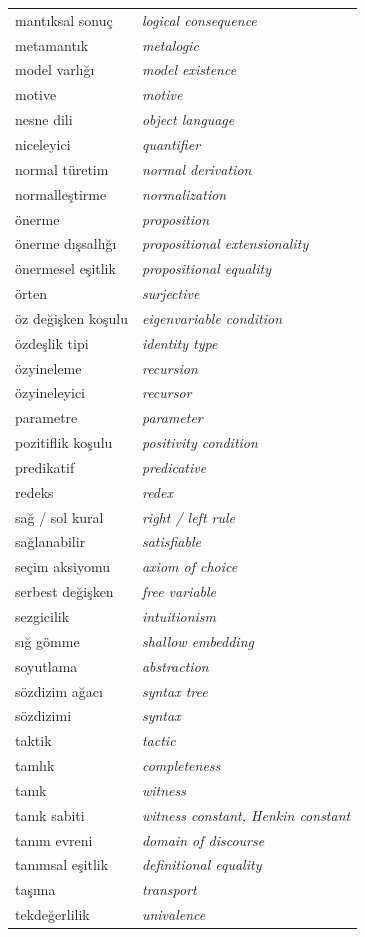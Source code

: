 \begin{center}
\begin{tabularx}{\linewidth}{>{\raggedright\arraybackslash}X >{\raggedright\arraybackslash\itshape}X}
mantıksal sonuç & logical consequence \\
metamantık & metalogic \\
model varlığı & model existence \\
motive & motive \\
nesne dili & object language \\
niceleyici & quantifier \\
normal türetim & normal derivation \\
normalleştirme & normalization \\
önerme & proposition \\
önerme dışsallığı & propositional extensionality \\
önermesel eşitlik & propositional equality \\
örten & surjective \\
öz değişken koşulu & eigenvariable condition \\
özdeşlik tipi & identity type \\
özyineleme & recursion \\
özyineleyici & recursor \\
parametre & parameter \\
pozitiflik koşulu & positivity condition \\
predikatif & predicative \\
redeks & redex \\
sağ / sol kural & right / left rule \\
sağlanabilir & satisfiable \\
seçim aksiyomu & axiom of choice \\
serbest değişken & free variable \\
sezgicilik & intuitionism \\
sığ gömme & shallow embedding \\
soyutlama & abstraction \\
sözdizim ağacı & syntax tree \\
sözdizimi & syntax \\
taktik & tactic \\
tamlık & completeness \\
tanık & witness \\
tanık sabiti & witness constant, Henkin constant \\
tanım evreni & domain of discourse \\
tanımsal eşitlik & definitional equality \\
taşıma & transport \\
tekdeğerlilik & univalence \\

\end{tabularx}
\end{center}
